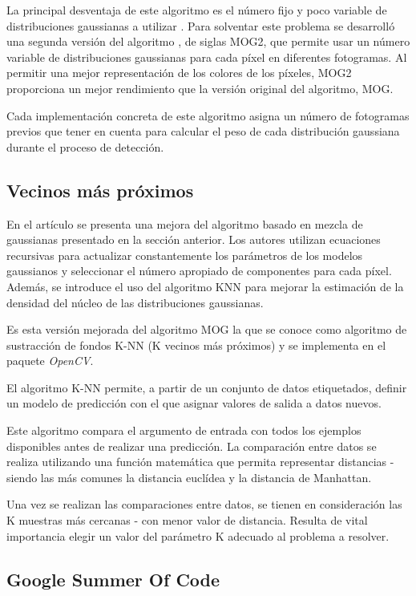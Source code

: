 La principal desventaja de este algoritmo es el número fijo y poco variable de distribuciones gaussianas a utilizar \cite{infomog}. Para solventar este problema se desarrolló una segunda versión del algoritmo \cite{mejoramog}, de siglas MOG2, que permite usar un número variable de distribuciones gaussianas para cada píxel en diferentes fotogramas. Al permitir una mejor representación de los colores de los píxeles, MOG2 proporciona un mejor rendimiento que la versión original del algoritmo, MOG. 

Cada implementación concreta de este algoritmo asigna un número de fotogramas previos que tener en cuenta para calcular el peso de cada distribución gaussiana durante el proceso de detección. 

\subsection{Vecinos más próximos}

En el artículo \cite{origenknn} se presenta una mejora del algoritmo basado en mezcla de gaussianas presentado en la sección anterior. Los autores utilizan ecuaciones recursivas para actualizar constantemente los parámetros de los modelos gaussianos y seleccionar el número apropiado de componentes para cada píxel. Además, se introduce el uso del algoritmo KNN para mejorar la estimación de la densidad del núcleo de las distribuciones gaussianas. 

Es esta versión mejorada del algoritmo MOG la que se conoce como algoritmo de sustracción de fondos K-NN (K vecinos más próximos) y se implementa en el paquete \textit{OpenCV}.

El algoritmo K-NN permite, a partir de un conjunto de datos etiquetados, definir un modelo de predicción con el que asignar valores de salida a datos nuevos.

Este algoritmo compara el argumento de entrada con todos los ejemplos disponibles antes de realizar una predicción. La comparación entre datos se realiza utilizando una función matemática que permita representar distancias - siendo las más comunes la distancia euclídea y la distancia de Manhattan.

Una vez se realizan las comparaciones entre datos, se tienen en consideración las K muestras más cercanas - con menor valor de distancia. Resulta de vital importancia elegir un valor del parámetro K adecuado al problema a resolver.

\subsection{Google Summer Of Code}

